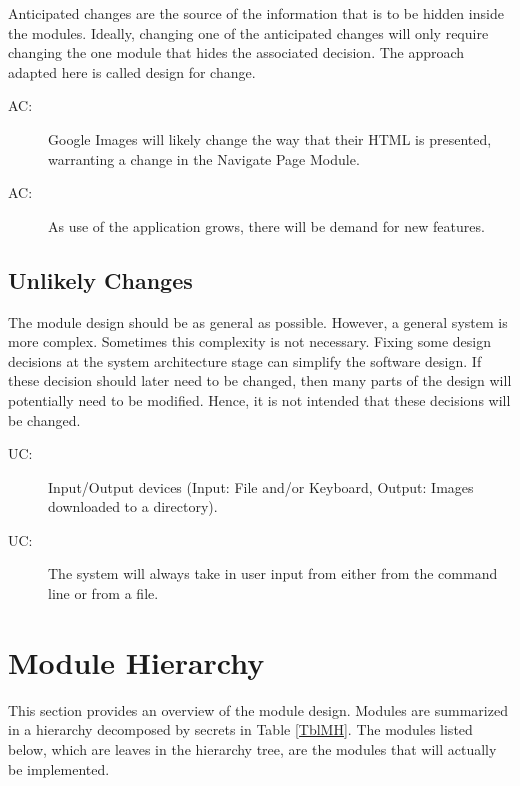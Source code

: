 \documentclass[12pt, titlepage]{article}
\newcounter{acnum}
\newcommand{\actheacnum}{AC\theacnum}
\newcounter{ucnum}
\newcommand{\uctheucnum}{UC\theucnum}
\begin{document}
Anticipated changes are the source of the information that is to be hidden
inside the modules. Ideally, changing one of the anticipated changes will only
require changing the one module that hides the associated decision. The approach
adapted here is called design for
change.

\begin{description}
\item[ \actheacnum \label{acHTML}:] Google Images will likely change the way that their HTML is presented, warranting a change in the Navigate Page Module.
\item[ \actheacnum \label{acInput}:] As use of the application grows, there will be demand for new features.
\end{description}

\subsection{Unlikely Changes} \label{SecUchange}

The module design should be as general as possible. However, a general system is
more complex. Sometimes this complexity is not necessary. Fixing some design
decisions at the system architecture stage can simplify the software design. If
these decision should later need to be changed, then many parts of the design
will potentially need to be modified. Hence, it is not intended that these
decisions will be changed.

\begin{description}
\item[ \uctheucnum \label{ucIO}:] Input/Output devices
  (Input: File and/or Keyboard, Output: Images downloaded to a directory).
\item[ \uctheucnum \label{ucInput}:] The system will always take in user input from either from the command line or from a file.
\end{description}

\section{Module Hierarchy} \label{SecMH}

This section provides an overview of the module design. Modules are summarized
in a hierarchy decomposed by secrets in Table \ref{TblMH}. The modules listed
below, which are leaves in the hierarchy tree, are the modules that will
actually be implemented.
\end{document}
